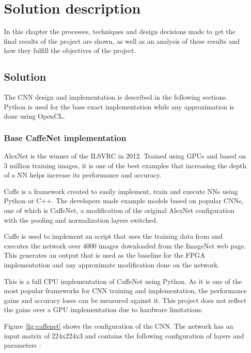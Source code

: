 \chapter{Solution description}

In this chapter the processes, techniques and design decisions made
to get the final results of the project are shown, as well as an analysis
of these results and how they fulfill the objectives of the project.

\section{Solution}

The CNN design and implementation is described in the following sections.
Python is used for the base exact implementation while any approximation is done
using OpenCL.

\subsection{Base CaffeNet implementation}

AlexNet is the winner of the ILSVRC in 2012. Trained using GPUs and based on 3 million training images, it is one
of the best examples that increasing the depth of a NN helps increase its performance and accuracy.

Caffe is a framework created to easily implement, train and execute NNs using Python or C++.
The developers made example models based on popular CNNs, one of which is CaffeNet, a modification of the original
AlexNet configuration with the pooling and normalization layers switched.

Caffe is used to implement an script that uses the training data from \cite{donahue2012bvlc} and executes the network
over 4000 images downloaded from the ImageNet web page. This generates an output that is used as the baseline
for the FPGA implementation and any approximate modification done on the network.

This is a full CPU implementation of CaffeNet using Python. As it is one of the most popular frameworks for CNN
training and implementation, the performance gains and accuracy loses can be measured against it. This project
does not reflect the gains over a GPU implementation due to hardware limitations.

Figure \ref{fig:caffenet} shows the configuration of the CNN. The network has an input matrix of 224{x}224{x}3
and 
contains the following configuration of layers and parameters \cite{reviewalex}:

